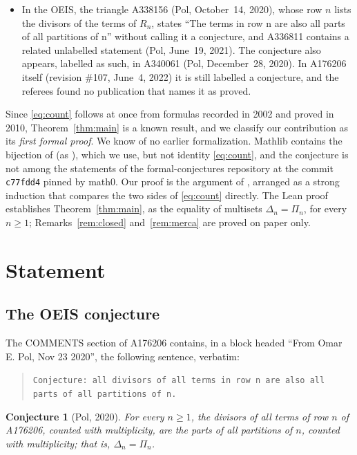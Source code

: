\documentclass[11pt]{amsart}
\theoremstyle{plain}
\newtheorem{conjecture}[theorem]{Conjecture}
\theoremstyle{definition}
\begin{document}
\begin{itemize}
\item In the OEIS, the triangle A338156 \cite{A338156} (Pol, October~14, 2020), whose row $n$ lists the divisors of the terms of $R_n$, states ``The terms in row n are also all parts of all partitions of n'' without calling it a conjecture, and A336811 \cite{A336811} contains a related unlabelled statement (Pol, June~19, 2021). The conjecture also appears, labelled as such, in A340061 \cite{A340061} (Pol, December~28, 2020).
In A176206 itself (revision \#107, June~4, 2022) it is still labelled a conjecture, and the referees found no publication that names it as proved.
\end{itemize}
Since \eqref{eq:count} follows at once from formulas recorded in 2002 and proved in 2010, Theorem~\ref{thm:main} is a known result, and we classify our contribution as its \emph{first formal proof}.
We know of no earlier formalization. Mathlib \cite{Mathlib} contains the bijection of \cite{DS10} (as ), which we use, but not identity \eqref{eq:count}, and the conjecture is not among the statements of the formal-conjectures repository \cite{FC} at the commit \texttt{c77fdd4} pinned by math0.
Our proof is the argument of \cite{DS10}, arranged as a strong induction that compares the two sides of \eqref{eq:count} directly.
The Lean proof establishes Theorem~\ref{thm:main}, as the equality of multisets $\Delta_n=\Pi_n$, for every $n\ge1$; Remarks~\ref{rem:closed} and~\ref{rem:merca} are proved on paper only.

\section{Statement}\label{sec:statement}

\subsection*{The OEIS conjecture}
The COMMENTS section of A176206 contains, in a block headed ``From Omar E. Pol, Nov 23 2020'', the following sentence, verbatim:
\begin{quote}
\texttt{Conjecture: all divisors of all terms in row n are also all parts of all partitions of n.}
\end{quote}

\begin{conjecture}[Pol, 2020]\label{conj}
For every $n\ge1$, the divisors of all terms of row $n$ of A176206, counted with multiplicity, are the parts of all partitions of $n$, counted with multiplicity; that is, $\Delta_n=\Pi_n$.
\end{conjecture}
\end{document}
